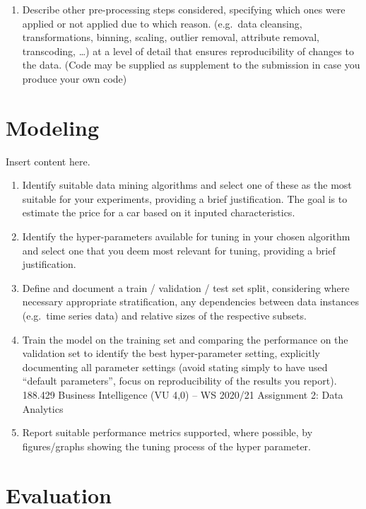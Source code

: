 \documentclass[sigchi]{acmart}
\def\tightlist{}
\begin{document}
\begin{enumerate}
\def\labelenumi{\alph{enumi}.}
\setcounter{enumi}{2}
\tightlist
\item
  Describe other pre-processing steps considered, specifying which ones were applied or not applied due to which reason. (e.g.~data cleansing, transformations, binning, scaling, outlier removal, attribute removal, transcoding, \ldots) at a level of detail that ensures reproducibility of changes to the data. (Code may be supplied as supplement to the submission in case you produce your own code)
\end{enumerate}

\hypertarget{modeling}{%
\section{Modeling}\label{modeling}}

Insert content here.

\begin{enumerate}
\def\labelenumi{\alph{enumi}.}
\item
  Identify suitable data mining algorithms and select one of these as the most suitable for your experiments, providing a brief justification.
  The goal is to estimate the price for a car based on it inputed characteristics.
\item
  Identify the hyper-parameters available for tuning in your chosen algorithm and select one that you deem most relevant for tuning, providing a brief justification.
\item
  Define and document a train / validation / test set split, considering where necessary appropriate stratification, any dependencies between data instances (e.g.~time series data) and relative sizes of the respective subsets.
\item
  Train the model on the training set and comparing the performance on the validation set to identify the best hyper-parameter setting, explicitly documenting all parameter settings (avoid stating simply to have used ``default parameters'', focus on reproducibility of the results you report).
  188.429 Business Intelligence (VU 4,0) -- WS 2020/21 Assignment 2: Data Analytics
\item
  Report suitable performance metrics supported, where possible, by figures/graphs showing the tuning process of the hyper parameter.
\end{enumerate}

\hypertarget{evaluation}{%
\section{Evaluation}\label{evaluation}}
\end{document}
